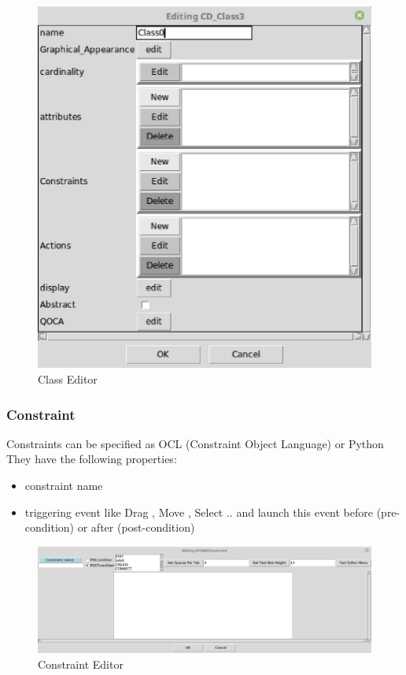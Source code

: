 \begin{figure}[th]
	\centering
		\includegraphics[scale=0.5]{chapiter3/img/class}
	\caption{\label{fig:Class Editor}Class Editor}
\end{figure} 
\subsubsection{ Constraint }

Constraints can be specified as OCL (Constraint Object Language) or Python
They have the following properties: 
\begin{itemize}
\item  constraint name
\item  triggering event  like Drag , Move , Select ..
and launch this event before (pre-condition) or after (post-condition)
 
\end{itemize}
 

\begin{figure}[th]
	\centering
	\includegraphics[scale=0.4]{chapiter3/img/cont}
	\caption{\label{fig:Constraint Editor}Constraint Editor}
\end{figure} 
\pagebreak
